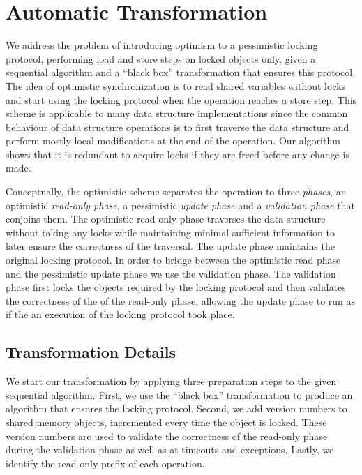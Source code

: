 \section{Automatic Transformation}\label{sec:algorithm}
We address the problem of introducing 
optimism to a pessimistic locking protocol, 
performing load and store steps on locked objects only, 
given a sequential algorithm and a ``black box'' 
transformation that ensures this protocol.
The idea of optimistic synchronization is to read 
shared variables without locks and start using the 
locking protocol when the operation reaches a store step.
This scheme is applicable to many data structure implementations
since the common behaviour of data structure operations 
is to first traverse the data structure and 
perform mostly local modifications at the end of the operation.
Our algorithm shows that it is redundant to 
acquire locks if they are freed before any change is made.    

Conceptually, the optimistic scheme separates the operation to three
\emph{phases}, an optimistic \emph{read-only phase},
a pessimistic \emph{update phase} and a 
\emph{validation phase} that conjoins them. 
The optimistic read-only phase traverses the data 
structure without taking any locks while maintaining 
minimal sufficient information to later ensure the 
correctness of the traversal.
The update phase maintains the original locking protocol. 
In order to bridge between the optimistic read phase and the  
pessimistic update phase we use the validation phase. 
The validation phase first locks the objects required by
the locking protocol and then validates the correctness
of the of the read-only phase, allowing the 
update phase to run as if the an execution of the locking
protocol took place.  

  


\subsection{Transformation Details}
We start our transformation by applying three preparation steps
to the given sequential algorithm. 
First, we use the ``black box'' transformation to produce an
algorithm that ensures the locking protocol. Second, we add 
version numbers to shared memory objects, incremented every 
time the object is locked. These version numbers are used 
to validate the correctness of the read-only phase during 
the validation phase as well as at timeouts and exceptions.
Lastly, we identify the read only prefix of each operation. 

